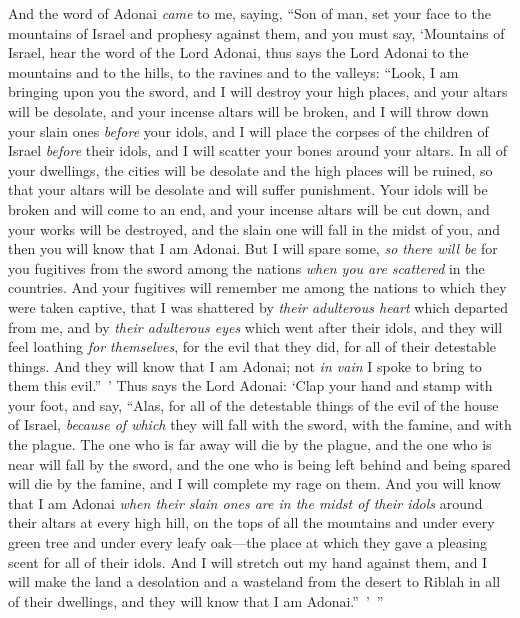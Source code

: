 \begin{biblechapter} %
 And the word of Adonai \textit{came} to me, saying,
\verse “Son of man, set your face to the mountains of Israel and prophesy against them,
\verse and you must say, ‘Mountains of Israel, hear the word of the Lord Adonai, thus says the Lord Adonai to the mountains and to the hills, to the ravines and to the valleys: “Look, I am bringing upon you the sword, and I will destroy your high places,
\verse and your altars will be desolate, and your incense altars will be broken, and I will throw down your slain ones \textit{before} your idols,
\verse and I will place the corpses of the children of Israel \textit{before} their idols, and I will scatter your bones around your altars.
\verse In all of your dwellings, the cities will be desolate and the high places will be ruined, so that your altars will be desolate and will suffer punishment. Your idols will be broken and will come to an end, and your incense altars will be cut down, and your works will be destroyed,
\verse and the slain one will fall in the midst of you, and then you will know that I am Adonai.
\verse But I will spare some, \textit{so there will be} for you fugitives from the sword among the nations \textit{when you are scattered} in the countries.
\verse And your fugitives will remember me among the nations to which they were taken captive, that I was shattered by \textit{their adulterous heart} which departed from me, and by \textit{their adulterous eyes} which went after their idols, and they will feel loathing \textit{for themselves}, for the evil that they did, for all of their detestable things.
\verse And they will know that I am Adonai; not \textit{in vain} I spoke to bring to them this evil.” ’
\verse Thus says the Lord Adonai: ‘Clap your hand and stamp with your foot, and say, “Alas, for all of the detestable things of the evil of the house of Israel, \textit{because of which} they will fall with the sword, with the famine, and with the plague.
\verse The one who is far away will die by the plague, and the one who is near will fall by the sword, and the one who is being left behind and being spared will die by the famine, and I will complete my rage on them.
\verse And you will know that I am Adonai \textit{when their slain ones are in the midst of their idols} around their altars at every high hill, on the tops of all the mountains and under every green tree and under every leafy oak—the place at which they gave a pleasing scent for all of their idols.
\verse And I will stretch out my hand against them, and I will make the land a desolation and a wasteland from the desert to Riblah in all of their dwellings, and they will know that I am Adonai.” ’ ”
\end{biblechapter}

